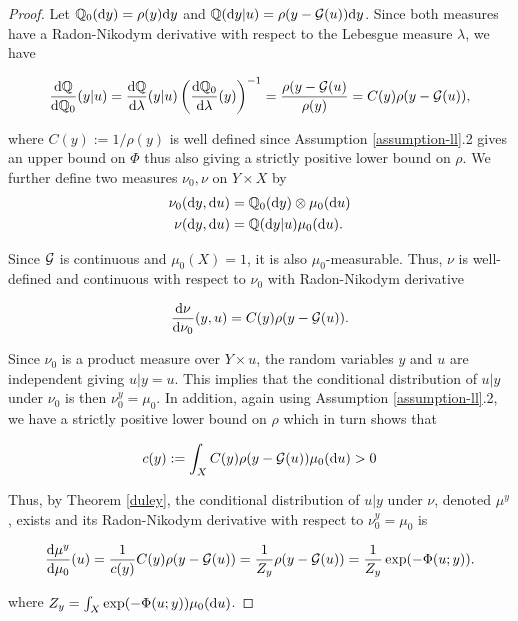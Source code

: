 \begin{proof}
  Let $\mathbb{Q}_0(\text{d} y) = \rho(y)\text{d} y$ and $\mathbb{Q}(\text{d} y|u) = \rho(y - \mathcal{G} (u))\text{d} y$. Since both measures have a Radon-Nikodym derivative with respect to the Lebesgue measure $\lambda$, we have

  \begin{equation*}
    \frac{\text{d} \mathbb{Q}}{\text{d} \mathbb{Q}_0}(y|u) = \frac{\text{d} \mathbb{Q}}{\text{d} \lambda}(y|u)\left(\frac{\text{d} \mathbb{Q}_0}{\text{d} \lambda}(y)\right)^{-1} = \frac{\rho(y - \mathcal{G} (u)}{\rho(y)} = C(y)\rho(y - \mathcal{G} (u)),
  \end{equation*}

  where $C(y) := 1 / \rho(y)$ is well defined since Assumption \ref{assumption-ll}.2 gives an upper bound on $\Phi$ thus also giving a strictly positive lower bound on $\rho$. We further define two measures $\nu_0, \nu$ on $Y \times X$ by
  \begin{equation*}
    \begin{aligned}
      \nu_0(\text{d} y, \text{d} u) &= \mathbb{Q}_0(\text{d} y) \otimes \mu_0(\text{d} u)\\
      \nu(\text{d} y, \text{d} u) &= \mathbb{Q}(\text{d} y|u) \mu_0(\text{d} u).
    \end{aligned}
  \end{equation*}
  
  Since $\mathcal{G}$ is continuous and $\mu_0(X) = 1$, it is also $\mu_0$-measurable. Thus, $\nu$ is well-defined and continuous with respect to $\nu_0$ with Radon-Nikodym derivative

  \begin{equation*}
    \frac{\text{d} \nu}{\text{d} \nu_0}(y, u) = C(y)\rho(y - \mathcal{G}(u)).
  \end{equation*}

  Since $\nu_0$ is a product measure over $Y \times u$, the random variables $y$ and $u$ are independent giving $u|y = u$. This implies that the conditional distribution of $u|y$ under $\nu_0$ is then $\nu_0^y = \mu_0$. In addition, again using Assumption \ref{assumption-ll}.2, we have a strictly positive lower bound on $\rho$ which in turn shows that

  \begin{equation*}
    c(y) := \int_X C(y)\rho(y - \mathcal{G}(u))\mu_0(\text{d} u) > 0 
  \end{equation*}

  Thus, by Theorem \ref{duley}, the conditional distribution of $u|y$ under $\nu$, denoted $\mu^y$, exists and its Radon-Nikodym derivative with respect to $\nu_0^y = \mu_0$ is

  \begin{equation*}
    \frac{\text{d} \mu^y}{\text{d} \mu_0}(u) = \frac1{c(y)}C(y)\rho(y - \mathcal{G} (u)) =  \frac1{Z_y}\rho(y - \mathcal{G} (u)) = \frac1{Z_y}\exp(-\Phi(u;y)).
  \end{equation*}
  
  where $Z_y = \int_X\exp(-\Phi(u;y))\mu_0(\text{d} u)$.
\end{proof}


